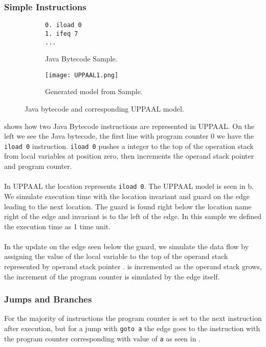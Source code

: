 \subsubsection{Simple Instructions}
\begin{figure}[H]
\centering
\begin{subfigure}{.3\textwidth}
  \begin{lstlisting}
0. iload 0
1. ifeq 7
...
  \end{lstlisting}
  \caption{Java Bytecode Sample.}
\end{subfigure} 
\hspace{10px}
\begin{subfigure}{.6\textwidth}
  \texttt{[image: UPPAAL1.png]}
  \caption{Generated model from Sample.}
\end{subfigure}
\caption{Java bytecode and corresponding UPPAAL model.}
\label{fig:uppaal1}
\end{figure}

 shows how two Java Bytecode instructions are represented in UPPAAL. On the left we see the Java bytecode, the first line with program counter 0 we have the \texttt{iload 0} instruction. \texttt{iload 0} pushes a integer to the top of the operation stack from local variables at position zero, then increments the operand stack pointer and program counter.\\\\
In UPPAAL the location  represents \texttt{iload 0}. The UPPAAL model is seen in b. We simulate execution time with the location invariant  and guard  on the edge leading to the next location. The guard is found right below the location name right of the edge and invariant is to the left of the edge. In this sample we defined the execution time as 1 time unit.\\\\
In the update on the edge seen below the guard, we simulate the data flow by assigning the value of the local variable  to the top of the operand stack  represented by operand stack pointer .  is incremented as the operand stack grows, the increment of the program counter is simulated by the edge itself.

\subsubsection{Jumps and Branches}
For the majority of instructions the program counter is set to the next instruction after execution, but for a jump with \texttt{goto a} the edge goes to the instruction with the program counter corresponding with value of \texttt{a} as seen in .

